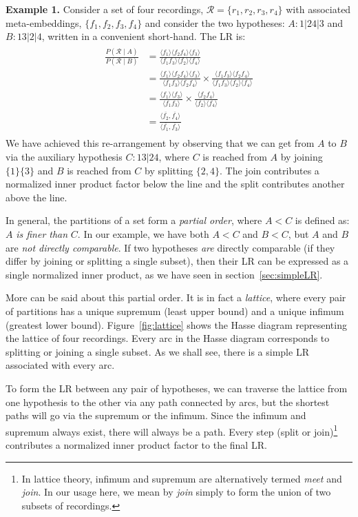 \documentclass[a4paper,oneside,12pt,english]{report}
\def\expv#1#2{\bigl\langle#1\bigr\rangle_{#2}}
\def\expp#1{\bigl\langle#1\bigr\rangle}
\def\Rset{\mathcal{R}}
\def\dot#1#2{\expv{#1,#2}{}}
\def\normal#1{\overline{#1}}
\def\dotn#1#2{\dot{\normal{#1}}{\normal{#2}}}
\begin{document}
\noindent\textbf{Example 1.} Consider a set of four recordings, $\Rset=\{r_1,r_2,r_3,r_4\}$ with associated meta-embeddings, $\{f_1,f_2,f_3,f_4\}$ and consider the two hypotheses: $A:1|24|3$ and $B:13|2|4$, written in a convenient short-hand. The LR is:
\begin{align}
\begin{split}
\frac{P(\Rset\mid A)}{P(\Rset\mid B)} &= \frac{\expp{f_1}\expp{f_2f_4}\expp{f_3}}{\expp{f_1f_3}\expp{f_2}\expp{f_4}}\\
&= \frac{\expp{f_1}\expp{f_2f_4}\expp{f_3}}{\expp{f_1f_3}\expp{f_2f_4}}\times
\frac{\expp{f_1f_3}\expp{f_2f_4}}{\expp{f_1f_3}\expp{f_2}\expp{f_4}} \\
&= \frac{\expp{f_1}\expp{f_3}}{\expp{f_1f_3}}\times
\frac{\expp{f_2f_4}}{\expp{f_2}\expp{f_4}} \\
&= \frac{\dotn{f_2}{f_4}}{\dotn{f_1}{f_3}}
\end{split}
\end{align} 
We have achieved this re-arrangement by observing that we can get from $A$ to $B$ via the auxiliary hypothesis $C:13|24$, where $C$ is reached from $A$ by joining $\{1\}\{3\}$ and $B$ is reached from $C$ by splitting $\{2,4\}$. The join contributes a normalized inner product factor below the line and the split contributes another above the line.

In general, the partitions of a set form a \emph{partial order}, where $A<C$ is defined as: $A$ \emph{is finer than} $C$. In our example, we have both $A<C$ and $B<C$, but $A$ and $B$ are \emph{not directly comparable}. If two hypotheses \emph{are} directly comparable (if they differ by joining or splitting a single subset), then their LR can be expressed as a single normalized inner product, as we have seen in section~\ref{sec:simpleLR}. 

More can be said about this partial order. It is in fact a \emph{lattice}, where every pair of partitions has a unique supremum (least upper bound) and a unique infimum (greatest lower bound). Figure~\ref{fig:lattice} shows the Hasse diagram representing the lattice of four recordings. Every arc in the Hasse diagram corresponds to splitting or joining a single subset. As we shall see, there is a simple LR associated with every arc. 

To form the LR between any pair of hypotheses, we can traverse the lattice from one hypothesis to the other via any path connected by arcs, but the shortest paths will go via the supremum or the infimum. Since the infimum and supremum always exist, there will always be a path. Every step (split or join)\footnote{In lattice theory, infimum and supremum are alternatively termed \emph{meet} and \emph{join}. In our usage here, we mean by \emph{join} simply to form the union of two subsets of recordings.} contributes a normalized inner product factor to the final LR. 
\end{document}
